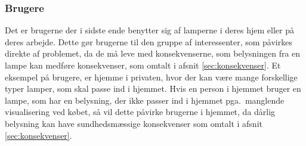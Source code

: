 \subsubsection{Brugere}
Det er brugerne der i sidste ende benytter sig af lamperne i deres hjem eller på deres arbejde. Dette gør brugerne til den gruppe af interessenter, som påvirkes direkte af problemet, da de må leve med konsekvenserne, som belysningen fra en lampe kan medføre konsekvenser, som omtalt i afsnit \ref{sec:konsekvenser}. Et eksempel på brugere, er hjemme i privaten, hvor der kan være mange forskellige typer lamper, som skal passe ind i hjemmet. Hvis en person i hjemmet bruger en lampe, som har en belysning, der ikke passer ind i hjemmet pga.\ manglende visualisering ved købet, så vil dette påvirke brugerne i hjemmet, da dårlig belysning kan have sundhedsmæssige konsekvenser som omtalt i afsnit \ref{sec:konsekvenser}.


